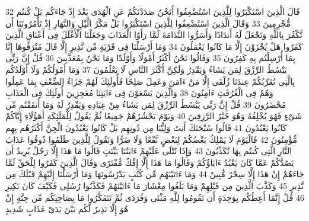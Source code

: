 \documentclass[20pt,a4paper]{article}
\begin{document}
{\tiny\colorbox{cl_aya}{32}} قَالَ الَّذِينَ اسْتَكْبَرُوا لِلَّذِينَ اسْتُضْعِفُوا أَنَحْنُ صَدَدْنَكُمْ عَنِ الْهُدَى بَعْدَ إِذْ جَاءَكُم بَلْ كُنتُم مُّجْرِمِينَ
{\tiny\colorbox{cl_aya}{33}} وَقَالَ الَّذِينَ اسْتُضْعِفُوا لِلَّذِينَ اسْتَكْبَرُوا بَلْ مَكْرُ الَّيْلِ وَالنَّهَارِ إِذْ تَأْمُرُونَنَا أَن نَّكْفُرَ بِاللَّهِ وَنَجْعَلَ لَهُ أَندَادًا وَأَسَرُّوا النَّدَامَةَ لَمَّا رَأَوُا الْعَذَابَ وَجَعَلْنَا الْأَغْلَلَ فِى أَعْنَاقِ الَّذِينَ كَفَرُوا هَلْ يُجْزَوْنَ إِلَّا مَا كَانُوا يَعْمَلُونَ
{\tiny\colorbox{cl_aya}{34}} وَمَا أَرْسَلْنَا فِى قَرْيَةٍ مِّن نَّذِيرٍ إِلَّا قَالَ مُتْرَفُوهَا إِنَّا بِمَا أُرْسِلْتُم بِهِ كَفِرُونَ
{\tiny\colorbox{cl_aya}{35}} وَقَالُوا نَحْنُ أَكْثَرُ أَمْوَلًا وَأَوْلَدًا وَمَا نَحْنُ بِمُعَذَّبِينَ
{\tiny\colorbox{cl_aya}{36}} قُلْ إِنَّ رَبِّى يَبْسُطُ الرِّزْقَ لِمَن يَشَاءُ وَيَقْدِرُ وَلَكِنَّ أَكْثَرَ النَّاسِ لَا يَعْلَمُونَ
{\tiny\colorbox{cl_aya}{37}} وَمَا أَمْوَلُكُمْ وَلَا أَوْلَدُكُم بِالَّتِى تُقَرِّبُكُمْ عِندَنَا زُلْفَى إِلَّا مَنْ ءَامَنَ وَعَمِلَ صَلِحًا فَأُولَئِكَ لَهُمْ جَزَاءُ الضِّعْفِ بِمَا عَمِلُوا وَهُمْ فِى الْغُرُفَتِ ءَامِنُونَ
{\tiny\colorbox{cl_aya}{38}} وَالَّذِينَ يَسْعَوْنَ فِى ءَايَتِنَا مُعَجِزِينَ أُولَئِكَ فِى الْعَذَابِ مُحْضَرُونَ
{\tiny\colorbox{cl_aya}{39}} قُلْ إِنَّ رَبِّى يَبْسُطُ الرِّزْقَ لِمَن يَشَاءُ مِنْ عِبَادِهِ وَيَقْدِرُ لَهُ وَمَا أَنفَقْتُم مِّن شَىْءٍ فَهُوَ يُخْلِفُهُ وَهُوَ خَيْرُ الرَّزِقِينَ
{\tiny\colorbox{cl_aya}{40}} وَيَوْمَ يَحْشُرُهُمْ جَمِيعًا ثُمَّ يَقُولُ لِلْمَلَئِكَةِ أَهَؤُلَاءِ إِيَّاكُمْ كَانُوا يَعْبُدُونَ
{\tiny\colorbox{cl_aya}{41}} قَالُوا سُبْحَنَكَ أَنتَ وَلِيُّنَا مِن دُونِهِم بَلْ كَانُوا يَعْبُدُونَ الْجِنَّ أَكْثَرُهُم بِهِم مُّؤْمِنُونَ
{\tiny\colorbox{cl_aya}{42}} فَالْيَوْمَ لَا يَمْلِكُ بَعْضُكُمْ لِبَعْضٍ نَّفْعًا وَلَا ضَرًّا وَنَقُولُ لِلَّذِينَ ظَلَمُوا ذُوقُوا عَذَابَ النَّارِ الَّتِى كُنتُم بِهَا تُكَذِّبُونَ
{\tiny\colorbox{cl_aya}{43}} وَإِذَا تُتْلَى عَلَيْهِمْ ءَايَتُنَا بَيِّنَتٍ قَالُوا مَا هَذَا إِلَّا رَجُلٌ يُرِيدُ أَن يَصُدَّكُمْ عَمَّا كَانَ يَعْبُدُ ءَابَاؤُكُمْ وَقَالُوا مَا هَذَا إِلَّا إِفْكٌ مُّفْتَرًى وَقَالَ الَّذِينَ كَفَرُوا لِلْحَقِّ لَمَّا جَاءَهُمْ إِنْ هَذَا إِلَّا سِحْرٌ مُّبِينٌ
{\tiny\colorbox{cl_aya}{44}} وَمَا ءَاتَيْنَهُم مِّن كُتُبٍ يَدْرُسُونَهَا وَمَا أَرْسَلْنَا إِلَيْهِمْ قَبْلَكَ مِن نَّذِيرٍ
{\tiny\colorbox{cl_aya}{45}} وَكَذَّبَ الَّذِينَ مِن قَبْلِهِمْ وَمَا بَلَغُوا مِعْشَارَ مَا ءَاتَيْنَهُمْ فَكَذَّبُوا رُسُلِى فَكَيْفَ كَانَ نَكِيرِ
{\tiny\colorbox{cl_aya}{46}} قُلْ إِنَّمَا أَعِظُكُم بِوَحِدَةٍ أَن تَقُومُوا لِلَّهِ مَثْنَى وَفُرَدَى ثُمَّ تَتَفَكَّرُوا مَا بِصَاحِبِكُم مِّن جِنَّةٍ إِنْ هُوَ إِلَّا نَذِيرٌ لَّكُم بَيْنَ يَدَىْ عَذَابٍ شَدِيدٍ
\end{document}
